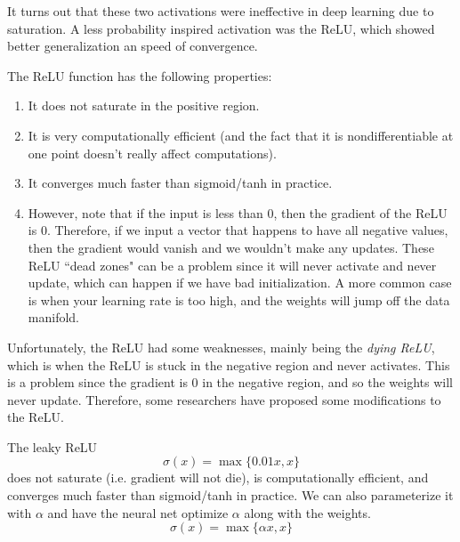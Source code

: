   It turns out that these two activations were ineffective in deep learning due to saturation. A less probability inspired activation was the ReLU, which showed better generalization an speed of convergence. 

  \begin{definition}
    \label{def:rectified-linear-unit}
    The ReLU function has the following properties: 
    \begin{enumerate}
        \item It does not saturate in the positive region. 
        \item It is very computationally efficient (and the fact that it is nondifferentiable at one point doesn't really affect computations). 
        \item It converges much faster than sigmoid/tanh in practice. 
        \item However, note that if the input is less than $0$, then the gradient of the ReLU is $0$. Therefore, if we input a vector that happens to have all negative values, then the gradient would vanish and we wouldn't make any updates. These ReLU ``dead zones" can be a problem since it will never activate and never update, which can happen if we have bad initialization. A more common case is when your learning rate is too high, and the weights will jump off the data manifold. 
    \end{enumerate}
  \end{definition}

  Unfortunately, the ReLU had some weaknesses, mainly being the \textit{dying ReLU}, which is when the ReLU is stuck in the negative region and never activates. This is a problem since the gradient is $0$ in the negative region, and so the weights will never update. Therefore, some researchers have proposed some modifications to the ReLU. 

  \begin{definition}
    \label{def:leaky-relu}
    The leaky ReLU 
    \begin{equation}
      \sigma(x) = \max\{0.01 x, x\}
    \end{equation}
    does not saturate (i.e. gradient will not die), is computationally efficient, and converges much faster than sigmoid/tanh in practice. We can also parameterize it with $\alpha$ and have the neural net optimize $\alpha$ along with the weights. 
    \begin{equation}
      \sigma(x) = \max\{\alpha x, x\}
    \end{equation}
  \end{definition}


